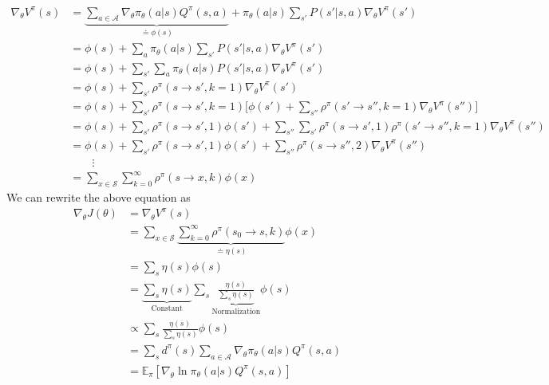 \begin{align*}
	\nabla_\theta V^\pi(s) &= \underbrace{\sum_{a\in \mathcal{A}}\nabla_\theta \pi_\theta(a|s)Q^\pi(s,a)}_{\doteq \phi(s)} + \pi_\theta(a|s) \sum_{s'} P(s'|s,a) \nabla_\theta V^\pi(s') \\
	&= \phi(s) + \sum_a \pi_\theta(a|s)\sum_{s'} P(s'|s,a) \nabla_\theta V^\pi(s') \\
	&= \phi(s) + \sum_{s'} \sum_a \pi_\theta(a|s)P(s'|s,a) \nabla_\theta V^\pi(s') \\
	&= \phi(s) + \sum_{s'}\rho^\pi(s\to s', k=1) \nabla_\theta V^\pi(s') \\
	&= \phi(s) + \sum_{s'}\rho^\pi(s\to s', k=1) \Bigg[\phi(s') + \sum_{s''}\rho^\pi(s'\to s'', k=1) \nabla_\theta V^\pi(s'') \Bigg]\\
	&= \phi(s) + \sum_{s'}\rho^\pi(s\to s', 1)\phi(s') + \sum_{s''}\sum_{s'}\rho^\pi(s\to s', 1)\rho^\pi(s'\to s'', k=1) \nabla_\theta V^\pi(s'') \\
	&= \phi(s) + \sum_{s'}\rho^\pi(s\to s', 1)\phi(s') + \sum_{s''}\rho^\pi(s\to s'', 2)\nabla_\theta V^\pi(s'') \\
	& \quad \quad \vdots\\
	&= \sum_{x\in \mathcal{S}}\sum_{k=0}^{\infty}\rho^\pi(s\to x, k)\phi(x)
\end{align*}
We can rewrite the above equation as
\begin{align*}
	\nabla_\theta J(\theta) &= \nabla_\theta V^\pi(s)\\
	&= \sum_{x\in \mathcal{S}}\underbrace{\sum_{k=0}^{\infty}\rho^\pi(s_0\to s, k)}_{\doteq \eta(s)}\phi(x)\\
	&= \sum_s \eta(s)\phi(s)\\
	&= \underbrace{\sum_s \eta(s)}_{\textrm{Constant}}\sum_s \underbrace{\frac{\eta(s)}{\sum_s \eta(s)}}_{\textrm{Normalization}}\phi(s)\\
	&\propto \sum_s \frac{\eta(s)}{\sum_s \eta(s)}\phi(s)\\
	&= \sum_s d^\pi(s)\sum_{a\in \mathcal{A}}\nabla_\theta \pi_\theta(a|s)Q^\pi(s,a)\\
	&= \mathbb{E}_{\pi}[\nabla_\theta \ln\pi_\theta(a|s)Q^\pi(s,a)]
\end{align*}
